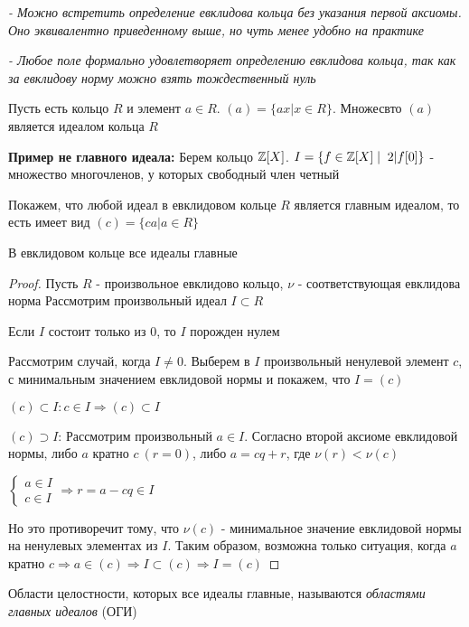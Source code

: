 \begin{normalsize}
    \notice \textit{ - Можно встретить определение евклидова кольца без указания первой аксиомы. Оно эквивалентно
    приведенному выше, но чуть менее удобно на практике}

    \notice \textit{ - Любое поле формально удовлетворяет определению евклидова кольца, так как за евклидову 
    норму можно взять тождественный нуль}
    
    \begin{conj}
        Пусть есть кольцо $R$ и элемент $a \in R$. $(a) = \{ax | x \in R\}$. 
        Множесвто $(a)$ является идеалом кольца $R$
    \end{conj}

    \textbf{Пример не главного идеала: } 
    Берем кольцо $\mathbb{Z}[X]$. $I = \{f \in \mathbb{Z}[X] \mid \; 2| f[0]\}$ -  множество многочленов, 
    у которых свободный член четный

    \qquad Покажем, что любой идеал в евклидовом кольце $R$ является главным идеалом,
    то есть имеет вид $(c) = \{ca|a \in R\}$

    \begin{theorem-non}
        В евклидовом кольце все идеалы главные
    \end{theorem-non}
    \begin{proof}
        Пусть $R$ - произвольное евклидово кольцо, $\nu$ - соответствующая евклидова норма
        Рассмотрим произвольный идеал $I \subset R$

        Если $I$ состоит только из $0$, то $I$ порожден нулем 

        Рассмотрим случай, когда $I \neq 0$. Выберем в $I$ 
        произвольный ненулевой элемент $c$, с минимальным значением евклидовой нормы и покажем, что $I = (c)$
        
        $(c) \subset I: c \in I \Longrightarrow (c) \subset I$

        $(c) \supset I$: Рассмотрим произвольный $a \in I$. Согласно второй аксиоме евклидовой нормы,
        либо $a$ кратно $c \ (r = 0)$, либо $a = cq + r$, где $\nu(r) < \nu(c)$
        
        $\begin{cases}
            a \in I \\
            c \in I
        \end{cases} \Longrightarrow r = a - cq \in I$

        Но это противоречит тому, что $\nu(c)$ - минимальное значение евклидовой нормы 
        на ненулевых элементах из $I$. Таким образом, возможна только ситуация, когда $a$ кратно $c \Longrightarrow a \in (c) 
        \Longrightarrow I \subset (c) \Longrightarrow I = (c)$ 
    \end{proof}
    \begin{conj}
        Области целостности,  которых все идеалы главные, называются \textit{областями главных идеалов} (ОГИ)       
    \end{conj}
\end{normalsize}